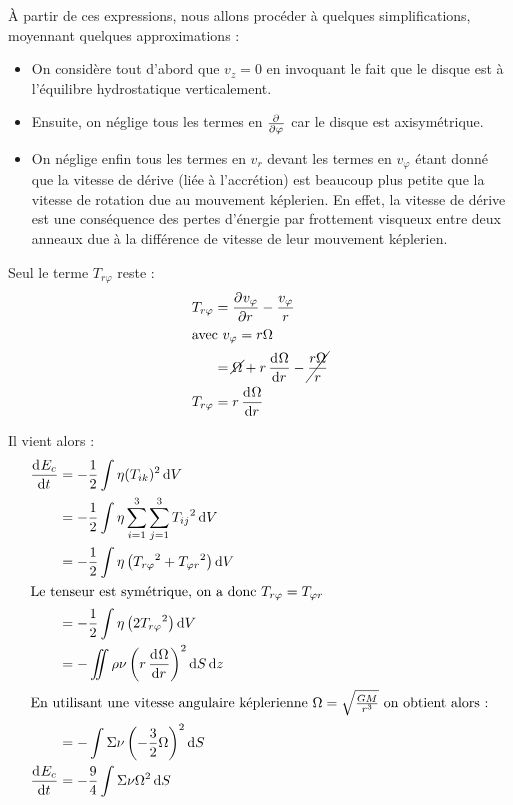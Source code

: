 À partir de ces expressions, nous allons procéder à quelques simplifications, moyennant quelques approximations : 
\begin{itemize}
\item On considère tout d'abord que $v_z=0$ en invoquant le fait que le disque est à l'équilibre hydrostatique verticalement. 

\item Ensuite, on néglige tous les termes en $\pd{}{\varphi}$ car le disque est axisymétrique. 

\item On néglige enfin tous les termes en $v_r$ devant les termes en $v_\varphi$ étant donné que la vitesse de dérive (liée à l'accrétion) est beaucoup plus petite que la vitesse de rotation due au mouvement képlerien. En effet, la vitesse de dérive est une conséquence des pertes d'énergie par frottement visqueux entre deux anneaux due à la différence de vitesse de leur mouvement képlerien.
\end{itemize}




Seul le terme $T_{r\varphi}$ reste :
\begin{align}
T_{r\varphi} &= \dpd{v_\varphi}{r} - \frac{v_\varphi}{r}\nonumber\\
\intertext{avec $v_\varphi=r\Omega$}
&= \cancel{\Omega} + r\dod{\Omega}{r} - \cancel{\frac{r\Omega}{r}}\nonumber\\
T_{r\varphi} &= r\dod{\Omega}{r}
\end{align}

Il vient alors :
\begin{align*}
\dod{E_c}{t} &= - \frac{1}{2}\int \eta(T_{ik})^2\dif V\\
&= - \frac{1}{2}\int \eta\sum_{i=1}^3\sum_{j=1}^3 {T_{ij}}^2\dif V\\
&= - \frac{1}{2}\int \eta\left({T_{r\varphi}}^2+{T_{\varphi r}}^2\right)\dif V\\
\intertext{Le tenseur est symétrique, on a donc $T_{r\varphi} = T_{\varphi r}$}
&= - \frac{1}{2}\int \eta\left(2{T_{r\varphi}}^2\right)\dif V\\
&= - \iint \rho\nu \left(r\dod{\Omega}{r}\right)^2\dif S\dif z\\
\intertext{En utilisant une vitesse angulaire képlerienne $\Omega=\sqrt{\frac{GM}{r^3}}$ on obtient alors :}
&= - \int \Sigma\nu \left(-\frac{3}{2}\Omega\right)^2\dif S\\
\dod{E_c}{t} &= - \frac{9}{4} \int \Sigma\nu \Omega^2\dif S
\end{align*}

